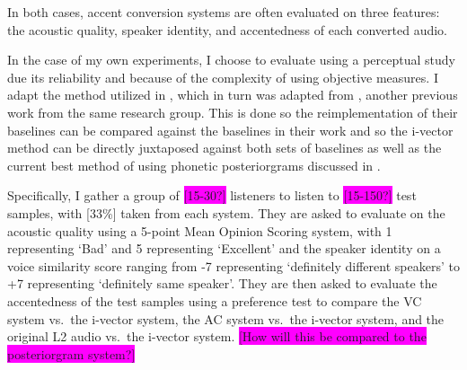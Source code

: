 \documentclass
[
    a4paper,
    twoside,
    12pt,
]
{report}
\begin{document}
In both cases, accent conversion systems are often evaluated on three
features: the acoustic quality, speaker identity, and accentedness of
each converted audio.

In the case of my own experiments, I choose to evaluate using a
perceptual study due its reliability and because of the complexity of
using objective measures. I adapt the method utilized in
\textcite{zhao2018a}, which in turn was adapted from
\textcite{aryal2014}, another previous work from the same research
group. This is done so the reimplementation of their baselines can be
compared against the baselines in their work and so the i-vector method
can be directly juxtaposed against both sets of baselines as well as the
current best method of using phonetic posteriorgrams discussed in
\textcite{zhao2018a}.

Specifically, I gather a group of \colorbox{magenta}{[15-30?]} listeners
to listen to \colorbox{magenta}{[15-150?]} test samples, with {[}33\%{]}
taken from each system. They are asked to evaluate on the acoustic
quality using a 5-point Mean Opinion Scoring system, with 1 representing
`Bad' and 5 representing `Excellent' and the speaker identity on a voice
similarity score ranging from -7 representing `definitely different
speakers' to +7 representing `definitely same speaker'. They are then
asked to evaluate the accentedness of the test samples using a
preference test to compare the VC system vs.~the i-vector system, the AC
system vs.~the i-vector system, and the original L2 audio vs.~the
i-vector system.
\colorbox{magenta}{[How will this be compared to the posteriorgram system?]}
\cleardoublepage
% 
% 

\printbibliography
\end{document}
